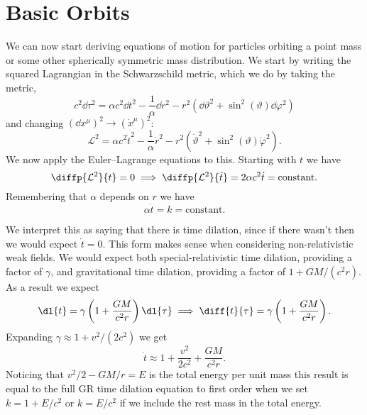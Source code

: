 \documentclass[fleqn]{NotesClass}
\newcommand*{\lagrangian}{\mathcal{L}}
\begin{document}
    \section{Basic Orbits}
    We can now start deriving equations of motion for particles orbiting a point mass or some other spherically symmetric mass distribution.
    We start by writing the squared Lagrangian in the Schwarzschild metric, which we do by taking the metric,
    \begin{equation}
        c^2 \dd{\tau}^2 = \alpha c^2 \dd{t}^2 - \frac{1}{\alpha}\dd{r}^2 - r^2(\dd{\vartheta}^2 + \sin^2(\vartheta)\dd{\varphi}^2)
    \end{equation}
    and changing \((\dd{x}^\mu)^2 \to (\dot{x}^\mu)^2\):
    \begin{equation}
        \lagrangian^2 = \alpha c^2 \dot{t}^2 - \frac{1}{\alpha} \dot{r}^2 - r^2 (\dot{\vartheta}^2 + \sin^2(\vartheta)\dot{\varphi}^2).
    \end{equation}
    We now apply the Euler--Lagrange equations to this.
    Starting with \(t\) we have
    \begin{equation}
        \diffp{\lagrangian^2}{t} = 0 \implies \diffp{\lagrangian^2}{\dot{t}} = 2\alpha c^2\dot{t} = \text{constant}.
    \end{equation}
    Remembering that \(\alpha\) depends on \(r\) we have
    \begin{equation}
        \alpha \dot{t} = k = \text{constant}.
    \end{equation}

    We interpret this as saying that there is time dilation, since if there wasn't then we would expect \(\dot{t} = 0\).
    This form makes sense when considering non-relativistic weak fields.
    We would expect both special-relativistic time dilation, providing a factor of \(\gamma\), and gravitational time dilation, providing a factor of \(1 + GM/(c^2r)\).
    As a result we expect
    \begin{equation}
        \dl{t} = \gamma \left( 1 + \frac{GM}{c^2r} \right) \dl{\tau} \implies \diff{t}{\tau} = \gamma \left( 1 + \frac{GM}{c^2r} \right).
    \end{equation}
    Expanding \(\gamma \approx 1 + v^2/(2c^2)\) we get
    \begin{equation}
        \dot{t} \approx 1 + \frac{v^2}{2c^2} + \frac{GM}{c^2r}.
    \end{equation}
    Noticing that \(v^2/2 - GM/r = E\) is the total energy per unit mass this result is equal to the full GR time dilation equation to first order when we set \(k = 1 + E/c^2\) or \(k = E/c^2\) if we include the rest mass in the total energy.
    
\end{document}
